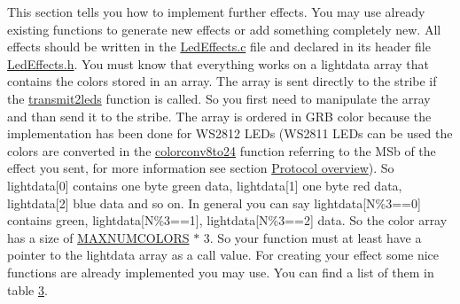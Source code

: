 This section tells you how to implement further effects. You may use already existing functions to generate new effects or add something completely new. All effects should be written in the \hyperlink{_led_effects_8c}{Led\+Effects.\+c} file and declared in its header file \hyperlink{_led_effects_8h}{Led\+Effects.\+h}. You must know that everything works on a lightdata array that contains the colors stored in an array. The array is sent directly to the stribe if the \hyperlink{_lightstribe_8h_aac724dad670e4a26723daf71ce6a8d8a}{transmit2leds} function is called. So you first need to manipulate the array and than send it to the stribe. The array is ordered in G\+R\+B color because the implementation has been done for W\+S2812 L\+E\+Ds (W\+S2811 L\+E\+Ds can be used the colors are converted in the \hyperlink{_led_effects_8h_a55291315ab0f2ca8d508f0e9da1920a7}{colorconv8to24} function referring to the M\+Sb of the effect you sent, for more information see section \hyperlink{index_protocol_sec}{Protocol overview}). So lightdata\mbox{[}0\mbox{]} contains one byte green data, lightdata\mbox{[}1\mbox{]} one byte red data, lightdata\mbox{[}2\mbox{]} blue data and so on. In general you can say lightdata\mbox{[}N\%3==0\mbox{]} contains green, lightdata\mbox{[}N\%3==1\mbox{]}, lightdata\mbox{[}N\%3==2\mbox{]} data. So the color array has a size of \hyperlink{globals_8h_a6e2b9e79df9491377ae405ef85aa0ca5}{M\+A\+X\+N\+U\+M\+C\+O\+L\+O\+R\+S} $\ast$ 3. So your function must at least have a pointer to the lightdata array as a call value. For creating your effect some nice functions are already implemented you may use. You can find a list of them in table \hyperlink{index_functiontable}{3}.

